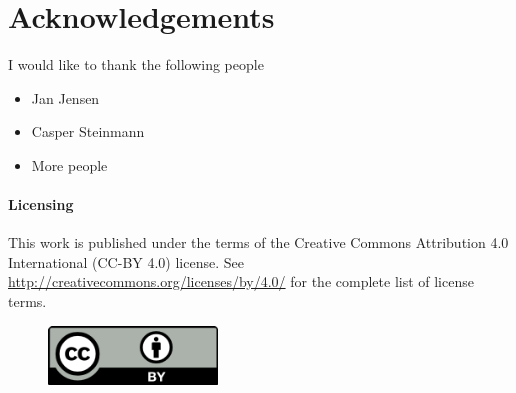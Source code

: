 \chapter*{Acknowledgements}
I would like to thank the following people

\begin{itemize}
\item Jan Jensen
\item Casper Steinmann
\item More people
\end{itemize}


\subsubsection*{Licensing}
This work is published under the terms of the Creative Commons Attribution 4.0 International (CC-BY 4.0) license. See \url{http://creativecommons.org/licenses/by/4.0/} for the complete list of license terms.
\begin{figure}
\centering\includegraphics[width=0.4\textwidth]{figures/cc-by.pdf}
\end{figure}
